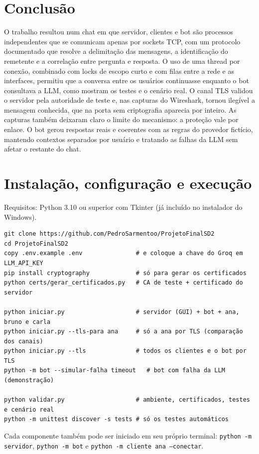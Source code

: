 \documentclass[11pt,a4paper]{article}
\newcommand{\cod}[1]{\texttt{#1}}
\begin{document}
\section{Conclusão}
O trabalho resultou num chat em que servidor, clientes e bot são processos independentes que se
comunicam apenas por sockets TCP, com um protocolo documentado que resolve a delimitação das mensagens, a
identificação do remetente e a correlação entre pergunta e resposta. O uso de uma thread por conexão,
combinado com locks de escopo curto e com filas entre a rede e as interfaces, permitiu que a conversa entre
os usuários continuasse enquanto o bot consultava a LLM, como mostram os testes e o cenário real. O canal
TLS validou o servidor pela autoridade de teste e, nas capturas do Wireshark, tornou ilegível a mensagem
conhecida, que na porta sem criptografia aparecia por inteiro. As capturas também deixaram claro o limite do
mecanismo: a proteção vale por enlace. O bot gerou respostas reais e coerentes com as regras do provedor
fictício, mantendo contextos separados por usuário e tratando as falhas da LLM sem afetar o restante do chat.

\appendix
\section{Instalação, configuração e execução}
Requisitos: Python 3.10 ou superior com Tkinter (já incluído no instalador do Windows).
\begin{lstlisting}
git clone https://github.com/PedroSarmentoo/ProjetoFinalSD2
cd ProjetoFinalSD2
copy .env.example .env               # e coloque a chave do Groq em LLM_API_KEY
pip install cryptography             # só para gerar os certificados
python certs/gerar_certificados.py   # CA de teste + certificado do servidor

python iniciar.py                    # servidor (GUI) + bot + ana, bruno e carla
python iniciar.py --tls-para ana     # só a ana por TLS (comparação dos canais)
python iniciar.py --tls              # todos os clientes e o bot por TLS
python -m bot --simular-falha timeout   # bot com falha da LLM (demonstração)

python validar.py                    # ambiente, certificados, testes e cenário real
python -m unittest discover -s tests # só os testes automáticos
\end{lstlisting}
Cada componente também pode ser iniciado em seu próprio terminal: \cod{python -m servidor},
\cod{python -m bot} e \cod{python -m cliente ana --conectar}.
\end{document}

